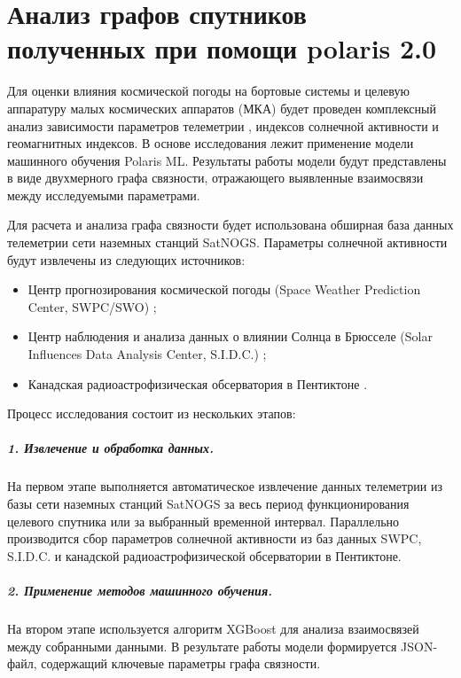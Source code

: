 \documentclass[14pt, a4paper]{src/bsu}
\begin{document}
\newpage

\chapter{Анализ графов спутников полученных при помощи polaris 2.0}

Для оценки влияния космической погоды на бортовые системы и целевую
аппаратуру малых космических аппаратов (МКА) будет проведен
комплексный анализ зависимости параметров телеметрии
\cite{green_2017_impact} \cite{schlag_2018_numerical}
\cite{boumghar_2018_enhanced}, индексов солнечной активности и
геомагнитных индексов. В основе исследования лежит применение
модели машинного обучения Polaris ML. Результаты работы модели
будут представлены в виде двухмерного графа связности, отражающего
выявленные взаимосвязи между исследуемыми параметрами.

Для расчета и анализа графа связности будет использована обширная
база данных телеметрии сети наземных станций SatNOGS. Параметры
солнечной активности будут извлечены из следующих источников:

\begin{itemize} \item Центр прогнозирования космической погоды (Space
	      Weather Prediction Center, SWPC/SWO) \cite{swpc_noaa_data_souce};
	\item Центр наблюдения и анализа данных о влиянии Солнца в Брюсселе
	      (Solar Influences Data Analysis Center, S.I.D.C.)
	      \cite{silso_snd_data_source}; \item Канадская
	      радиоастрофизическая обсерватория в Пентиктоне
	      \cite{swgc_flux_data_source}. \end{itemize}

Процесс исследования состоит из нескольких этапов:

\paragraph*{1. Извлечение и обработка данных.} На первом этапе
выполняется автоматическое извлечение данных телеметрии из базы сети
наземных станций SatNOGS за весь период функционирования целевого
спутника или за выбранный временной интервал. Параллельно
производится сбор параметров солнечной активности из баз данных SWPC,
S.I.D.C. и канадской радиоастрофизической обсерватории в Пентиктоне.

\paragraph*{2. Применение методов машинного обучения.} На втором
этапе используется алгоритм XGBoost для анализа взаимосвязей между
собранными данными. В результате работы модели формируется JSON-файл,
содержащий ключевые параметры графа связности.
\end{document}
